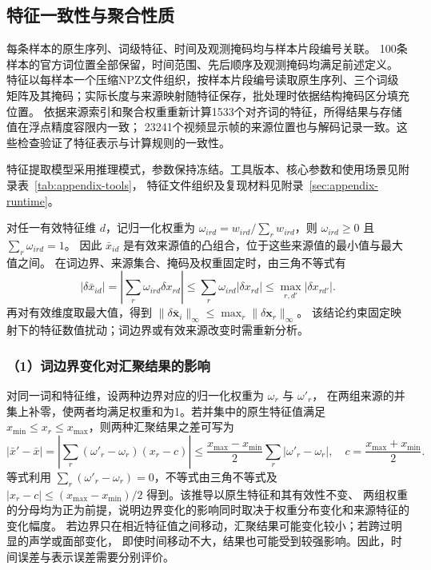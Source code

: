 \documentclass[bwprint]{gmcmthesis}
\begin{document}
\subsection{特征一致性与聚合性质}
每条样本的原生序列、词级特征、时间及观测掩码均与样本片段编号关联。
100条样本的官方词位置全部保留，时间范围、先后顺序及观测掩码均满足前述定义。
特征以每样本一个压缩NPZ文件组织，按样本片段编号读取原生序列、三个词级矩阵及其掩码；实际长度与来源映射随特征保存，批处理时依据结构掩码区分填充位置。
依据来源索引和聚合权重重新计算1533个对齐词的特征，所得结果与存储值在浮点精度容限内一致；
23241个视频显示帧的来源位置也与解码记录一致。这些检查验证了特征表示与计算规则的一致性。

特征提取模型采用推理模式，参数保持冻结。工具版本、核心参数和使用场景见附录表~\ref{tab:appendix-tools}，
特征文件组织及复现材料见附录~\ref{sec:appendix-runtime}。

对任一有效特征维 $d$，记归一化权重为
$\omega_{ird}=w_{ird}/\sum_r w_{ird}$，则 $\omega_{ird}\geq0$ 且 $\sum_r\omega_{ird}=1$。
因此 $\bar x_{id}$ 是有效来源值的凸组合，位于这些来源值的最小值与最大值之间。
在词边界、来源集合、掩码及权重固定时，由三角不等式有
\[
 |\delta\bar x_{id}|=
 \left|\sum_r\omega_{ird}\delta x_{rd}\right|
 \leq\sum_r\omega_{ird}|\delta x_{rd}|
 \leq\max_{r,d'}|\delta x_{rd'}|.
\]
再对有效维度取最大值，得到
$\|\delta\bar{\boldsymbol x}_i\|_\infty\leq\max_r\|\delta\boldsymbol x_r\|_\infty$。
该结论约束固定映射下的特征数值扰动；词边界或有效来源改变时需重新分析。

\subsubsection*{（1）词边界变化对汇聚结果的影响}
对同一词和特征维，设两种边界对应的归一化权重为 $\omega_r$ 与 $\omega'_r$，
在两组来源的并集上补零，使两者均满足权重和为1。若并集中的原生特征值满足
$x_{\min}\leq x_r\leq x_{\max}$，则两种汇聚结果之差可写为
\begin{equation}
 \left|\bar x'-\bar x\right|
 =\left|\sum_r(\omega'_r-\omega_r)(x_r-c)\right|
 \leq\frac{x_{\max}-x_{\min}}{2}\sum_r|\omega'_r-\omega_r|,
 \quad c=\frac{x_{\max}+x_{\min}}{2}.
 \label{eq:p1-weight-stability}
\end{equation}
等式利用 $\sum_r(\omega'_r-\omega_r)=0$，不等式由三角不等式及
$|x_r-c|\leq(x_{\max}-x_{\min})/2$ 得到。该推导以原生特征和其有效性不变、
两组权重的分母均为正为前提，说明边界变化的影响同时取决于权重分布变化和来源特征的变化幅度。
若边界只在相近特征值之间移动，汇聚结果可能变化较小；若跨过明显的声学或面部变化，
即使时间移动不大，结果也可能受到较强影响。因此，时间误差与表示误差需要分别评价。
\end{document}
